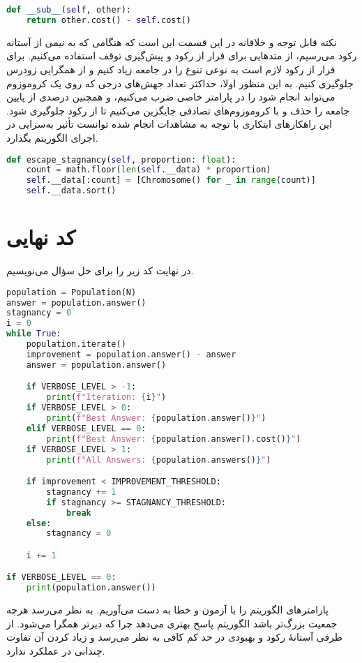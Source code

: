 \documentclass[a4paper, 12pt]{article}
\theoremstyle{definition}
\begin{document}
\LTR
\begin{lstlisting}[language=Python]
def __sub__(self, other):
    return other.cost() - self.cost()
\end{lstlisting}
\RTL

نکته قابل توجه و خلاقانه در این قسمت این است که هنگامی که به نیمی از آستانه رکود می‌رسیم، از متدهایی برای فرار از رکود و پیش‌گیری توقف استفاده می‌کنیم. برای فرار از رکود لازم است به نوعی تنوع را در جامعه زیاد کنیم و از همگرایی زودرس جلوگیری کنیم. به این منظور اولا، حداکثر تعداد جهش‌های درجی که روی یک کروموزوم می‌تواند انجام شود را در پارامتر خاصی ضرب می‌کنیم، و همچنین درصدی از پایین جامعه را حذف و با کروموزوم‌های تصادفی جایگزین می‌کنیم تا از رکود جلوگیری شود. این راهکارهای ابتکاری با توجه به مشاهدات انجام شده توانست تأثیر به‌سزایی در اجرای الگوریتم بگذارد.

\LTR
\begin{lstlisting}[language=Python]
def escape_stagnancy(self, proportion: float):
    count = math.floor(len(self.__data) * proportion)
    self.__data[:count] = [Chromosome() for _ in range(count)]
    self.__data.sort()
\end{lstlisting}
\RTL

\section{کد نهایی}
در نهایت کد زیر را برای حل سؤال می‌نویسیم.

\LTR
\begin{lstlisting}[language=Python]
population = Population(N)
answer = population.answer()
stagnancy = 0
i = 0
while True:
    population.iterate()
    improvement = population.answer() - answer
    answer = population.answer()

    if VERBOSE_LEVEL > -1:
        print(f"Iteration: {i}")
    if VERBOSE_LEVEL > 0:
        print(f"Best Answer: {population.answer()}")
    elif VERBOSE_LEVEL == 0:
        print(f"Best Answer: {population.answer().cost()}")
    if VERBOSE_LEVEL > 1:
        print(f"All Answers: {population.answers()}")

    if improvement < IMPROVEMENT_THRESHOLD:
        stagnancy += 1
        if stagnancy >= STAGNANCY_THRESHOLD:
            break
    else:
        stagnancy = 0

    i += 1

if VERBOSE_LEVEL == 0:
    print(population.answer())    
\end{lstlisting}
\RTL

پارامترهای الگوریتم را با آزمون و خطا به دست می‌آوریم. به نظر می‌رسد هرچه جمعیت بزرگ‌تر باشد الگوریتم پاسخ بهتری می‌دهد چرا که دیرتر همگرا می‌شود. از طرفی آستانهٔ رکود و بهبودی در حد کم کافی به نظر می‌رسد و زیاد کردن آن تفاوت چندانی در عملکرد ندارد.
\end{document}
